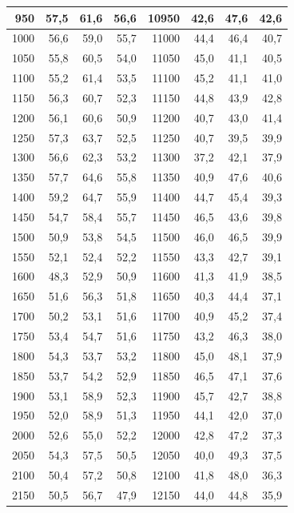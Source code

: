 \begin{small}
\begin{longtable}{|r|r|r|r|r|r|r|r|}
950 & 57,5 & 61,6 & 56,6 & 10950 & 42,6 & 47,6 & 42,6 \\ \hline
1000 & 56,6 & 59,0 & 55,7 & 11000 & 44,4 & 46,4 & 40,7 \\ \hline
1050 & 55,8 & 60,5 & 54,0 & 11050 & 45,0 & 41,1 & 40,5 \\ \hline
1100 & 55,2 & 61,4 & 53,5 & 11100 & 45,2 & 41,1 & 41,0 \\ \hline
1150 & 56,3 & 60,7 & 52,3 & 11150 & 44,8 & 43,9 & 42,8 \\ \hline
1200 & 56,1 & 60,6 & 50,9 & 11200 & 40,7 & 43,0 & 41,4 \\ \hline
1250 & 57,3 & 63,7 & 52,5 & 11250 & 40,7 & 39,5 & 39,9 \\ \hline
1300 & 56,6 & 62,3 & 53,2 & 11300 & 37,2 & 42,1 & 37,9 \\ \hline
1350 & 57,7 & 64,6 & 55,8 & 11350 & 40,9 & 47,6 & 40,6 \\ \hline
1400 & 59,2 & 64,7 & 55,9 & 11400 & 44,7 & 45,4 & 39,3 \\ \hline
1450 & 54,7 & 58,4 & 55,7 & 11450 & 46,5 & 43,6 & 39,8 \\ \hline
1500 & 50,9 & 53,8 & 54,5 & 11500 & 46,0 & 46,5 & 39,9 \\ \hline
1550 & 52,1 & 52,4 & 52,2 & 11550 & 43,3 & 42,7 & 39,1 \\ \hline
1600 & 48,3 & 52,9 & 50,9 & 11600 & 41,3 & 41,9 & 38,5 \\ \hline
1650 & 51,6 & 56,3 & 51,8 & 11650 & 40,3 & 44,4 & 37,1 \\ \hline
1700 & 50,2 & 53,1 & 51,6 & 11700 & 40,9 & 45,2 & 37,4 \\ \hline
1750 & 53,4 & 54,7 & 51,6 & 11750 & 43,2 & 46,3 & 38,0 \\ \hline
1800 & 54,3 & 53,7 & 53,2 & 11800 & 45,0 & 48,1 & 37,9 \\ \hline
1850 & 53,7 & 54,2 & 52,9 & 11850 & 46,5 & 47,1 & 37,6 \\ \hline
1900 & 53,1 & 58,9 & 52,3 & 11900 & 45,7 & 42,7 & 38,8 \\ \hline
1950 & 52,0 & 58,9 & 51,3 & 11950 & 44,1 & 42,0 & 37,0 \\ \hline
2000 & 52,6 & 55,0 & 52,2 & 12000 & 42,8 & 47,2 & 37,3 \\ \hline
2050 & 54,3 & 57,5 & 50,5 & 12050 & 40,0 & 49,3 & 37,5 \\ \hline
2100 & 50,4 & 57,2 & 50,8 & 12100 & 41,8 & 48,0 & 36,3 \\ \hline
2150 & 50,5 & 56,7 & 47,9 & 12150 & 44,0 & 44,8 & 35,9 \\ \hline

\end{longtable}
\end{small}
